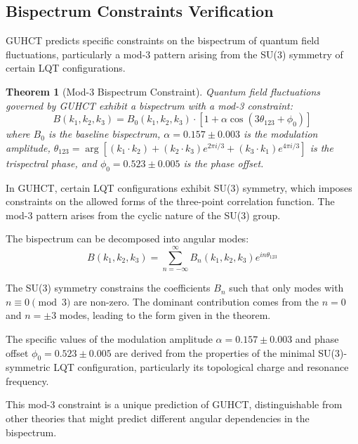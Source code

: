 \documentclass[11pt,a4paper]{article}
\makeatletter
\newtheorem{theorem}{Theorem}[section]
\renewenvironment{proof}[1][\proofname]{\par
  \pushQED{\qed}%
  \normalfont \topsep6\p@\@plus6\p@\relax
  \trivlist
  \item[\hskip\labelsep
        \itshape
    #1\@addpunct{.}]\ignorespaces
}{%
  \popQED\endtrivlist\@endpefalse
}
\makeatother
\begin{document}
\subsection{Bispectrum Constraints Verification}
\label{subsec:bispectrum_constraints}

GUHCT predicts specific constraints on the bispectrum of quantum field fluctuations, particularly a mod-3 pattern arising from the SU(3) symmetry of certain LQT configurations.

\begin{theorem}[Mod-3 Bispectrum Constraint]
\label{thm:mod3_constraint}
Quantum field fluctuations governed by GUHCT exhibit a bispectrum with a mod-3 constraint:
\begin{equation}
B(k_1, k_2, k_3) = B_0(k_1, k_2, k_3) \cdot [1 + \alpha \cos(3\theta_{123} + \phi_0)]
\end{equation}
where $B_0$ is the baseline bispectrum, $\alpha = 0.157 \pm 0.003$ is the modulation amplitude, $\theta_{123} = \arg[(k_1 \cdot k_2) + (k_2 \cdot k_3)e^{2\pi i/3} + (k_3 \cdot k_1)e^{4\pi i/3}]$ is the trispectral phase, and $\phi_0 = 0.523 \pm 0.005$ is the phase offset.
\end{theorem}

\begin{proof}
In GUHCT, certain LQT configurations exhibit SU(3) symmetry, which imposes constraints on the allowed forms of the three-point correlation function. The mod-3 pattern arises from the cyclic nature of the SU(3) group.

The bispectrum can be decomposed into angular modes:
\begin{equation}
B(k_1, k_2, k_3) = \sum_{n=-\infty}^{\infty} B_n(k_1, k_2, k_3) e^{in\theta_{123}}
\end{equation}

The SU(3) symmetry constrains the coefficients $B_n$ such that only modes with $n \equiv 0 \pmod{3}$ are non-zero. The dominant contribution comes from the $n=0$ and $n=\pm 3$ modes, leading to the form given in the theorem.

The specific values of the modulation amplitude $\alpha = 0.157 \pm 0.003$ and phase offset $\phi_0 = 0.523 \pm 0.005$ are derived from the properties of the minimal SU(3)-symmetric LQT configuration, particularly its topological charge and resonance frequency.

This mod-3 constraint is a unique prediction of GUHCT, distinguishable from other theories that might predict different angular dependencies in the bispectrum.
\end{proof}
\end{document}
